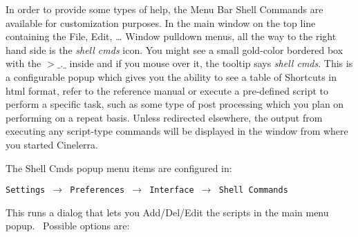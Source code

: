In order to provide some types of help, the Menu Bar Shell Commands are available for customization purposes. In the
main window on the top line containing the File, Edit, {\dots} Window pulldown menus, all the way to the right hand
side is the \textit{shell cmds} icon. You might see a small gold-color bordered box with the $>\_.\_$ inside
and if you mouse over it, the tooltip says \textit{shell cmds}. This is a configurable popup which gives you the ability to
see a table of Shortcuts in html format, refer to the reference manual or execute a pre-defined script to perform a
specific task, such as some type of post processing which you plan on performing on a repeat basis. Unless redirected
elsewhere, the output from executing any script-type commands will be displayed in the window from where you started
Cinelerra.

The Shell Cmds popup menu items are configured in:

\texttt{Settings $\rightarrow$ Preferences $\rightarrow$ Interface $\rightarrow$ Shell Commands}

This runs a dialog that lets you Add/Del/Edit the scripts in the main menu popup. \ Possible options are:\newline

